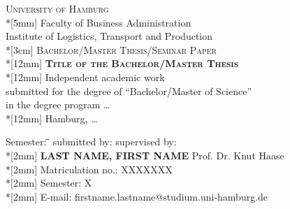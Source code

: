 \documentclass[11pt,a4paper]{article}
\begin{document}
\setcounter{page}{0} %
	\begin{titlepage}
		\begin{center}
			{\LARGE\scshape University of Hamburg}\\*[5mm]
      		{\normalsize Faculty of Business Administration\\
			Institute of Logistics, Transport and Production}\\*[3cm]
      		{\Large\scshape Bachelor/Master Thesis/Seminar Paper}\\*[12mm]
      		{\bfseries\Large\scshape Title of the Bachelor/Master Thesis}\\*[12mm] %
      		{\rmfamily Independent academic work\\
           	submitted for the degree of ``Bachelor/Master of Science''\\
           	in the degree program \ldots} \\*[12mm]
      		{\normalsize\rmfamily Hamburg, \ldots} %
		\end{center}
		\vspace{8cm}
		\begin{tabbing}
			Semester: \= \hspace{70mm}\= \kill
 			submitted by: \>\> supervised by: \\*[2mm]
      		\textbf{LAST NAME, FIRST NAME} \>\>  Prof. Dr. Knut Haase\\*[2mm] %
      		Matriculation no.: \> XXXXXXX \>  \\*[2mm] %
      		Semester: \> X \\*[2mm] %
      		E-mail: firstname.lastname@studium.uni-hamburg.de %
		\end{tabbing}
  \end{titlepage}

\newpage
{}
\tableofcontents

\newpage
{}
\listoffigures

\newpage
{}
\listoftables

\newpage
{}
\end{document}
